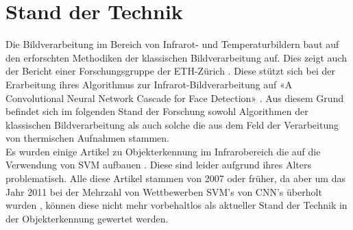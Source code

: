 \chapter{Stand der Technik}
\label{ch:StandDerTechnik}

Die Bildverarbeitung im Bereich von Infrarot- und Temperaturbildern baut auf den erforschten Methodiken der klassischen Bildverarbeitung auf. Dies zeigt auch der Bericht einer Forschungsgruppe der ETH-Zürich\parencite{gomez2018thermal} . Diese stützt sich bei der Erarbeitung ihres Algorithmus zur Infrarot-Bildverarbeitung auf «A Convolutional Neural Network Cascade for Face Detection»\parencite{li2015convolutional} . Aus diesem Grund befindet sich im folgenden Stand der Forschung sowohl Algorithmen der klassischen Bildverarbeitung als auch solche die aus dem Feld der Verarbeitung von thermischen Aufnahmen stammen.\\
Es wurden einige Artikel zu Objekterkennung im Infrarobereich die auf die Verwendung von \gls{SVM} aufbauen \parencite{suard2006pedestrian, bertozzi2003pedestrian, zhang2007pedestrian}. Diese sind leider aufgrund ihres Alters problematisch. Alle diese Artikel stammen von 2007 oder früher, da aber um das Jahr 2011 bei der Mehrzahl von Wettbewerben \gls{SVM}'s von \gls{CNN}'s überholt wurden \parencite{Historyo5:online}, können diese nicht mehr vorbehaltlos als aktueller Stand der Technik in der Objekterkennung gewertet werden.

